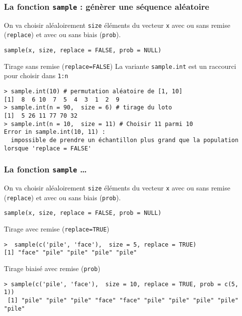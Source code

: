 \documentclass[10pt]{beamer}
\begin{document}
\begin{frame}[fragile]
  \frametitle{  La fonction \texttt{sample} : génèrer une séquence aléatoire}
  On va choisir aléaloirement \texttt{size} éléments du vecteur \texttt{x} avec ou sans remise (\texttt{replace}) et avec ou sans biais (\texttt{prob}).
  \begin{center}
    \alert{\texttt{sample(x, size, replace = FALSE, prob = NULL)}}
  \end{center}

 
  \begin{block}{Tirage sans remise (\texttt{replace=FALSE})}
La variante \texttt{sample.int} est un raccourci pour choisir dans \texttt{1:n}    
    \begin{lstlisting}
> sample.int(10) # permutation aléatoire de [1, 10]
[1]  8  6 10  7  5  4  3  1  2  9
> sample.int(n = 90,  size = 6) # tirage du loto
[1]  5 26 11 77 70 32
> sample.int(n = 10,  size = 11) # Choisir 11 parmi 10
Error in sample.int(10, 11) : 
  impossible de prendre un échantillon plus grand que la population lorsque 'replace = FALSE'
\end{lstlisting}
\end{block}
\end{frame}


\begin{frame}[fragile]
  \frametitle{  La fonction \texttt{sample} \dots}
  On va choisir aléaloirement \texttt{size} éléments du vecteur \texttt{x} avec ou sans remise (\texttt{replace}) et avec ou sans biais (\texttt{prob}).
  \begin{center}
    \alert{\texttt{sample(x, size, replace = FALSE, prob = NULL)}}
  \end{center}

\begin{block}{Tirage avec remise (\texttt{replace=TRUE})}
    \begin{lstlisting}[style=block]
>  sample(c('pile', 'face'),  size = 5, replace = TRUE) 
[1] "face" "pile" "pile" "pile" "pile"
\end{lstlisting}
\end{block}


\begin{block}{Tirage biaisé avec remise (\texttt{prob})}
    \begin{lstlisting}[style=block]
> sample(c('pile', 'face'),  size = 10, replace = TRUE, prob = c(5, 1)) 
 [1] "pile" "pile" "pile" "face" "face" "pile" "pile" "pile" "pile" "pile"
\end{lstlisting}
\end{block}

\end{frame}
\end{document}

